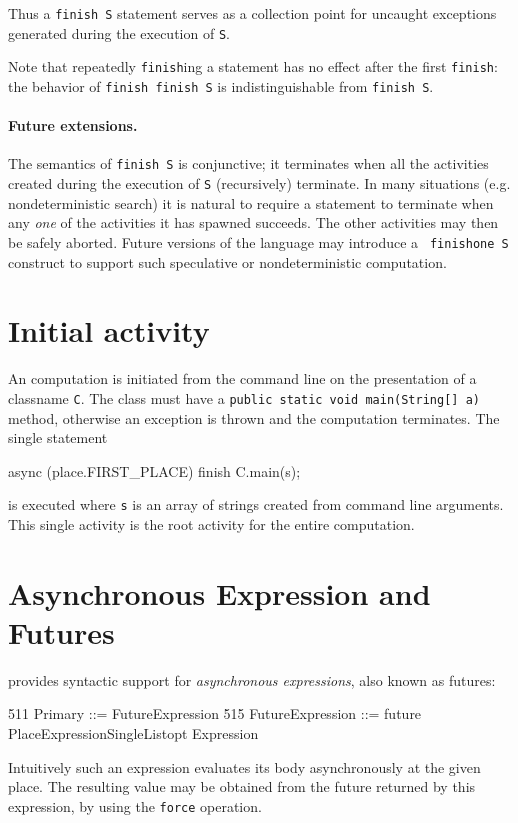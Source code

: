 Thus a {\tt finish S} statement serves as a collection point for
uncaught exceptions generated during the execution of {\tt S}.

Note that repeatedly {\tt finish}ing a statement has no effect after
the first {\tt finish}: the behavior of {\tt finish finish S} is
indistinguishable from {\tt finish S}.

\paragraph{Future extensions.} 

The semantics of {\tt finish S} is conjunctive; it terminates when all
the activities created during the execution of {\tt S} (recursively)
terminate. In many situations (e.g.{} nondeterministic search) it is
natural to require a statement to terminate when any {\em one} of the
activities it has spawned succeeds. The other activities may then be
safely aborted. Future versions of the language may introduce a {\tt
finishone S} construct to support such speculative or nondeterministic
computation.


\section{Initial activity}\label{initial-computation}

An \Xten{} computation is initiated from the command line on the
presentation of a classname {\tt C}. The class must have a {\tt public
static void main(String[] a)} method, otherwise an exception is thrown
and the computation terminates.  The single statement
\begin{x10}
async (place.FIRST\_PLACE) { finish C.main(s); }
\end{x10} 
\noindent is executed where {\tt s} is an array of strings created
from command line arguments. This single activity is the root activity
for the entire computation.


\section{Asynchronous Expression and Futures}\label{XtenFutures}

\Xten{} provides syntactic support for {\em asynchronous expressions}, also
known as futures:
\begin{x10}
511   Primary ::= FutureExpression
515   FutureExpression ::= 
        future PlaceExpressionSingleListopt 
           { Expression }
\end{x10} 
Intuitively such an expression evaluates its body asynchronously at
the given place. The resulting value may be obtained from the future
returned by this expression, by using the {\tt force} operation.

